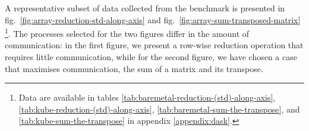 


A representative subset of data collected from the benchmark is presented in
fig.~\ref{fig:array-reduction-std-along-axis} and
fig.~\ref{fig:array-sum-transposed-matrix} \footnote{Data are available in
tables
\ref{tab:baremetal-reduction-(std)-along-axis},\ref{tab:kube-reduction-(std)-along-axis},
\ref{tab:baremetal-sum-the-transpose}, and \ref{tab:kube-sum-the-transpose} in
appendix \ref{appendix:dask}.}. The processes selected for the two figures
differ in the amount of communication: in the first figure, we present a
row-wise reduction operation that requires little communication, while for the
second figure, we have chosen a case that maximises communication, the sum of a
matrix and its transpose.

